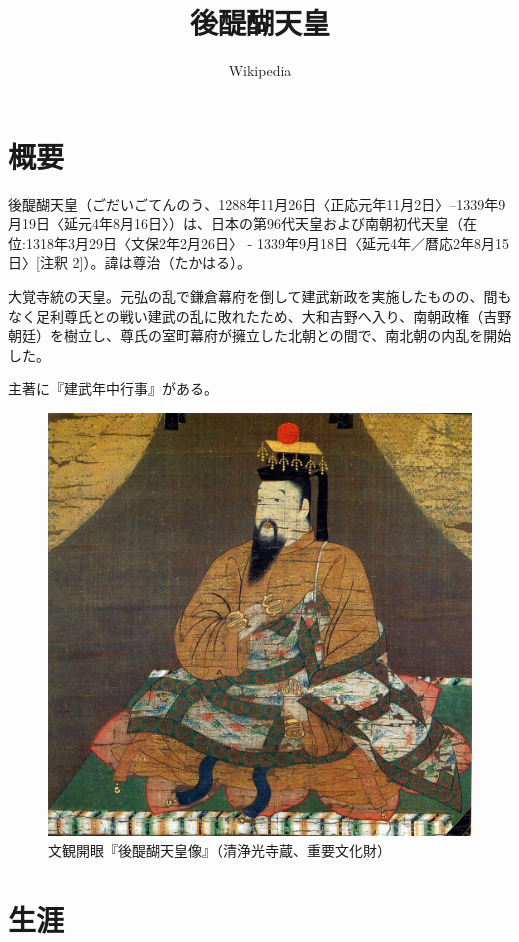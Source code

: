\documentclass[twocolumn]{jsarticle}
\title{後醍醐天皇}
\author{Wikipedia}
\begin{document}
\maketitle

\section{概要}

後醍醐天皇（ごだいごてんのう、1288年11月26日〈正応元年11月2日〉--1339年9月19日〈延元4年8月16日〉）は、日本の第96代天皇および南朝初代天皇（在位:1318年3月29日〈文保2年2月26日〉 - 1339年9月18日〈延元4年／暦応2年8月15日〉[注釈 2]）。諱は尊治（たかはる）。

大覚寺統の天皇。元弘の乱で鎌倉幕府を倒して建武新政を実施したものの、間もなく足利尊氏との戦い建武の乱に敗れたため、大和吉野へ入り、南朝政権（吉野朝廷）を樹立し、尊氏の室町幕府が擁立した北朝との間で、南北朝の内乱を開始した。

主著に『建武年中行事』がある。

\begin{figure}[tbh]
\centering
\includegraphics[keepaspectratio,scale=0.4]{Emperor_Godaigo.jpg}
\caption{文観開眼『後醍醐天皇像』（清浄光寺蔵、重要文化財）}
\label{fig:godaigo}
\end{figure}

\section{生涯}
\end{document}
